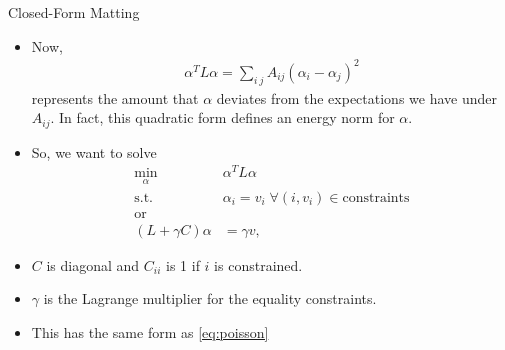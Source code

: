 \documentclass{beamer}
\begin{document}
\begin{frame}[allowframebreaks]{Closed-Form Matting \cite{levin2008closed}}
\begin{itemize}
  \item Now,
   \begin{align}
    \alpha^T L \alpha = \sum_{i~j} A_{ij}(\alpha_i-\alpha_j)^2
   \end{align}
   represents the amount that $\alpha$ deviates from the expectations we have
   under $A_{ij}$. In fact, this quadratic form defines an energy norm for $\alpha$.
  \item So, we want to solve
   \begin{align}
    \min_\alpha \; &\alpha^TL\alpha \\
    \text{s.t.} \; &\alpha_i = v_i \; \forall (i,v_i) \in \text{constraints} \nonumber \\
    \text{or} \nonumber \\
    (L + \gamma C) \alpha &= \gamma v,
   \end{align}
  \item $C$ is diagonal and $C_{ii}$ is 1 if $i$ is constrained.
  \item $\gamma$ is the Lagrange multiplier for the equality constraints.
  \item This has the same form as \eqref{eq:poisson}
 \end{itemize}
\end{frame}
\end{document}
